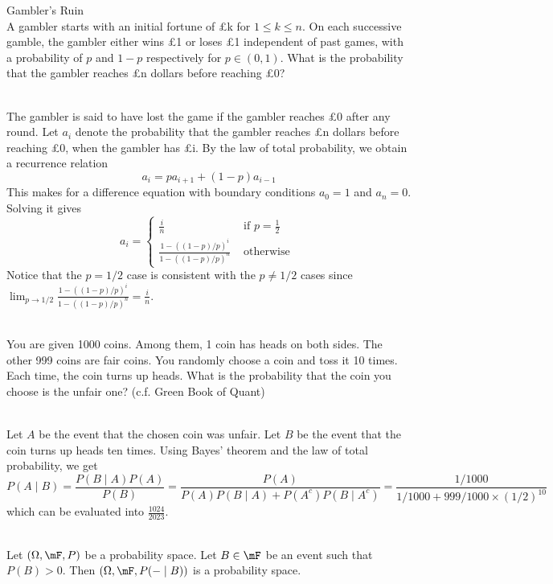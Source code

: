 \documentclass[a4paper]{article}
\begin{document}
\begin{eg}{Gambler's Ruin}{}\\
A gambler starts with an initial fortune of £k for $1\leq k\leq n$. On each successive gamble, the gambler either wins £1 or loses £1 independent of past games, with a probability of $p$ and $1-p$ respectively for $p\in(0,1)$. What is the probability that the gambler reaches £n dollars before reaching £0?
\begin{answer}\\
The gambler is said to have lost the game if the gambler reaches £0 after any round. Let $a_i$ denote the probability that the gambler reaches £n dollars before reaching £0, when the gambler has £i. By the law of total probability, we obtain a recurrence relation $$a_i=pa_{i+1}+(1-p)a_{i-1}$$ This makes for a difference equation with boundary conditions $a_0=1$ and $a_n=0$. Solving it gives $$a_i=\begin{cases}
\frac{i}{n} & \text{ if }p=\frac{1}{2}\\
\frac{1-((1-p)/p)^i}{1-((1-p)/p)^n} & \text{ otherwise }
\end{cases}$$ Notice that the $p=1/2$ case is consistent with the $p\neq 1/2$ cases since $\lim_{p\to 1/2}\frac{1-((1-p)/p)^i}{1-((1-p)/p)^n}=\frac{i}{n}$. 
\end{answer}
\end{eg}

\begin{eg}{}{}\\
You are given 1000 coins. Among them, 1 coin has heads on both sides. The other 999 coins are fair coins. You randomly choose a coin and toss it 10 times. Each time, the coin turns up heads. What is the probability that the coin you choose is the unfair one? (c.f. Green Book of Quant)
\begin{answer}\\
Let $A$ be the event that the chosen coin was unfair. Let $B$ be the event that the coin turns up heads ten times. Using Bayes' theorem and the law of total probability, we get $$P(A\;|\;B)=\frac{P(B\;|\;A)P(A)}{P(B)}=\frac{P(A)}{P(A)P(B\;|\;A)+P(A^c)P(B\;|\;A^c)}=\frac{1/1000}{1/1000+999/1000\times(1/2)^{10}}$$ which can be evaluated into $\frac{1024}{2023}$. 
\end{answer}
\end{eg}

\begin{prp}{}{}\\
Let $(\Omega,\mF,P)$ be a probability space. Let $B\in\mF$ be an event such that $P(B)>0$. Then $(\Omega,\mF,P(-\;|\;B))$ is a probability space. 
\end{prp}
\end{document}
